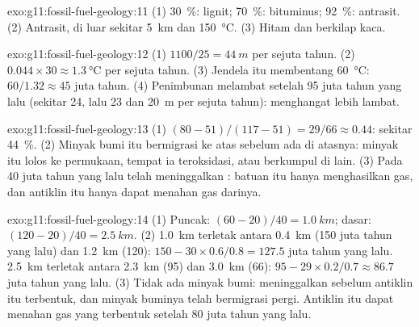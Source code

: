 \begin{solution}{exo:g11:fossil-fuel-geology:11}
(1) \qty{30}{\percent}: lignit; \qty{70}{\percent}:  bituminus;
\qty{92}{\percent}: antrasit. (2) Antrasit, di luar sekitar
\qty{5}{km} dan \qty{150}{\degreeCelsius}. (3) Hitam dan berkilap kaca.
\end{solution}

\begin{solution}{exo:g11:fossil-fuel-geology:12}
(1) $1100/25 = \qty{44}{m}$ per sejuta tahun. (2) $0.044 \times 30
\approx \qty{1.3}{\degreeCelsius}$ per sejuta tahun. (3) Jendela itu
membentang \qty{60}{\degreeCelsius}: $60/1.32 \approx 45$ juta tahun.
(4) Penimbunan melambat setelah 95 juta tahun yang lalu (sekitar 24, lalu 23
dan \qty{20}{m} per sejuta tahun):  menghangat lebih lambat.
\end{solution}

\begin{solution}{exo:g11:fossil-fuel-geology:13}
(1) $(80 - 51)/(117 - 51) = 29/66 \approx 0.44$: sekitar \qty{44}{\percent}.
(2) Minyak bumi itu bermigrasi ke atas sebelum ada  di atasnya: minyak
itu lolos ke permukaan, tempat ia teroksidasi, atau berkumpul di 
lain. (3) Pada 40 juta tahun yang lalu  telah meninggalkan : batuan itu hanya menghasilkan gas, dan antiklin itu hanya dapat menahan
gas darinya.
\end{solution}

\begin{solution}{exo:g11:fossil-fuel-geology:14}
(1) Puncak: $(60 - 20)/40 = \qty{1.0}{km}$; dasar: $(120 - 20)/40 =
\qty{2.5}{km}$. (2) \qty{1.0}{km} terletak antara \qty{0.4}{km} (150 juta
tahun yang lalu) dan \qty{1.2}{km} (120): $150 - 30 \times 0.6/0.8 = 127.5$
juta tahun yang lalu. \qty{2.5}{km} terletak antara \qty{2.3}{km} (95) dan
\qty{3.0}{km} (66): $95 - 29 \times 0.2/0.7 \approx 86.7$ juta tahun
yang lalu. (3) Tidak ada minyak bumi:  meninggalkan 
sebelum antiklin itu terbentuk, dan minyak buminya telah bermigrasi pergi.
Antiklin itu dapat menahan gas yang terbentuk setelah 80 juta tahun yang lalu.
\end{solution}

